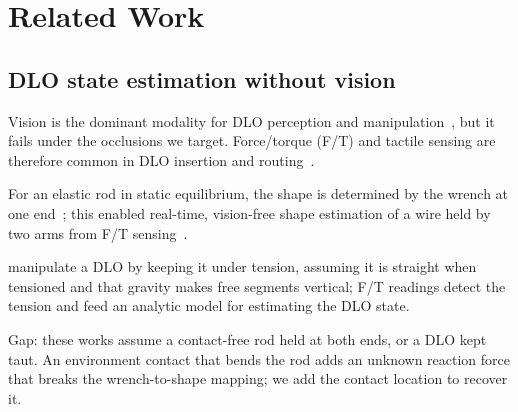 \section{Related Work}
\label{sec:related}

\subsection{DLO state estimation without vision}
\begin{outline}
  \item Vision is the dominant modality for DLO perception and
    manipulation~\cite{sanchez2018survey}, but it fails under the occlusions we
    target. Force/torque (F/T) and tactile sensing are therefore common in DLO
    insertion and
    routing~\cite{kr-aecsagphi-22,nkot-sditfw-97,slk-ftmdloeffi-22,wjly-cratmp-22,zdpp-dhattfmn-19,lvw-crcrisb-24}.
  \item For an elastic rod in static equilibrium, the shape is determined by
    the wrench at one end~\cite{bretl2014quasistatic}; this enabled real-time,
    vision-free shape estimation of a wire held by two arms from F/T
    sensing~\cite{mishani2022realtime}.
  \item \citet{slk-ftmdloeffi-22} manipulate a DLO by keeping it under tension,
    assuming it is straight when tensioned and that gravity makes free segments
    vertical; F/T readings detect the tension and feed an analytic model for
    estimating the DLO state.
  \item Gap: these works assume a contact-free rod held at both ends, or a DLO
    kept taut. An environment contact that bends the rod adds an unknown
    reaction force that breaks the wrench-to-shape mapping; we add the contact
    location to recover it.
\end{outline}

